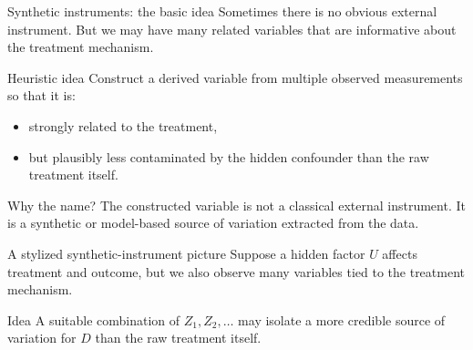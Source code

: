 \documentclass[dvipsnames,aspectratio=169,handout]{beamer}
\begin{document}
\begin{frame}{Synthetic instruments: the basic idea}
Sometimes there is no obvious external instrument.
But we may have many related variables that are informative about the treatment mechanism.

\begin{block}{Heuristic idea}
Construct a derived variable from multiple observed measurements so that it is:
\begin{itemize}
    \item strongly related to the treatment,
    \item but plausibly less contaminated by the hidden confounder than the raw treatment itself.
\end{itemize}
\end{block}

\begin{alertblock}{Why the name?}
The constructed variable is not a classical external instrument.
It is a synthetic or model-based source of variation extracted from the data.
\end{alertblock}
\end{frame}

\begin{frame}{A stylized synthetic-instrument picture}
Suppose a hidden factor $U$ affects treatment and outcome, but we also observe many variables tied to the treatment mechanism.

\begin{center}
\end{center}

\begin{block}{Idea}
A suitable combination of $Z_1,Z_2,\ldots$ may isolate a more credible source of variation for $D$ than the raw treatment itself.
\end{block}
\end{frame}
\end{document}
